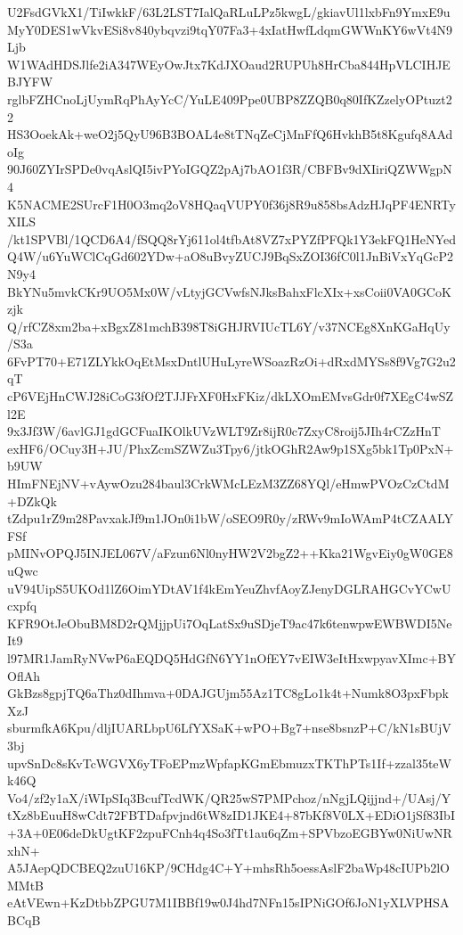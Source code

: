U2FsdGVkX1/TiIwkkF/63L2LST7IalQaRLuLPz5kwgL/gkiavUl1lxbFn9YmxE9u
MyY0DES1wVkvESi8v840ybqvzi9tqY07Fa3+4xIatHwfLdqmGWWnKY6wVt4N9Ljb
W1WAdHDSJlfe2iA347WEyOwJtx7KdJXOaud2RUPUh8HrCba844HpVLCIHJEBJYFW
rglbFZHCnoLjUymRqPhAyYcC/YuLE409Ppe0UBP8ZZQB0q80IfKZzelyOPtuzt22
HS3OoekAk+weO2j5QyU96B3BOAL4e8tTNqZeCjMnFfQ6HvkhB5t8Kgufq8AAdoIg
90J60ZYIrSPDe0vqAslQI5ivPYoIGQZ2pAj7bAO1f3R/CBFBv9dXIiriQZWWgpN4
K5NACME2SUrcF1H0O3mq2oV8HQaqVUPY0f36j8R9u858bsAdzHJqPF4ENRTyXILS
/kt1SPVBl/1QCD6A4/fSQQ8rYj611ol4tfbAt8VZ7xPYZfPFQk1Y3ekFQ1HeNYed
Q4W/u6YuWClCqGd602YDw+aO8uBvyZUCJ9BqSxZOI36fC0l1JnBiVxYqGcP2N9y4
BkYNu5mvkCKr9UO5Mx0W/vLtyjGCVwfsNJksBahxFlcXIx+xsCoii0VA0GCoKzjk
Q/rfCZ8xm2ba+xBgxZ81mchB398T8iGHJRVIUcTL6Y/v37NCEg8XnKGaHqUy/S3a
6FvPT70+E71ZLYkkOqEtMsxDntlUHuLyreWSoazRzOi+dRxdMYSs8f9Vg7G2u2qT
cP6VEjHnCWJ28iCoG3fOf2TJJFrXF0HxFKiz/dkLXOmEMvsGdr0f7XEgC4wSZl2E
9x3Jf3W/6avlGJ1gdGCFuaIKOlkUVzWLT9Zr8ijR0c7ZxyC8roij5JIh4rCZzHnT
exHF6/OCuy3H+JU/PhxZcmSZWZu3Tpy6/jtkOGhR2Aw9p1SXg5bk1Tp0PxN+b9UW
HImFNEjNV+vAywOzu284baul3CrkWMcLEzM3ZZ68YQl/eHmwPVOzCzCtdM+DZkQk
tZdpu1rZ9m28PavxakJf9m1JOn0i1bW/oSEO9R0y/zRWv9mIoWAmP4tCZAALYFSf
pMINvOPQJ5INJEL067V/aFzun6Nl0nyHW2V2bgZ2++Kka21WgvEiy0gW0GE8uQwc
uV94UipS5UKOd1lZ6OimYDtAV1f4kEmYeuZhvfAoyZJenyDGLRAHGCvYCwUcxpfq
KFR9OtJeObuBM8D2rQMjjpUi7OqLatSx9uSDjeT9ac47k6tenwpwEWBWDI5NeIt9
l97MR1JamRyNVwP6aEQDQ5HdGfN6YY1nOfEY7vEIW3eItHxwpyavXImc+BYOflAh
GkBzs8gpjTQ6aThz0dIhmva+0DAJGUjm55Az1TC8gLo1k4t+Numk8O3pxFbpkXzJ
sburmfkA6Kpu/dljIUARLbpU6LfYXSaK+wPO+Bg7+nse8bsnzP+C/kN1sBUjV3bj
upvSnDc8sKvTcWGVX6yTFoEPmzWpfapKGmEbmuzxTKThPTs1If+zzal35teWk46Q
Vo4/zf2y1aX/iWIpSIq3BcufTcdWK/QR25wS7PMPchoz/nNgjLQijjnd+/UAsj/Y
tXz8bEuuH8wCdt72FBTDafpvjnd6tW8zID1JKE4+87bKf8V0LX+EDiO1jSf83IbI
+3A+0E06deDkUgtKF2zpuFCnh4q4So3fTt1au6qZm+SPVbzoEGBYw0NiUwNRxhN+
A5JAepQDCBEQ2zuU16KP/9CHdg4C+Y+mhsRh5oessAslF2baWp48cIUPb2lOMMtB
eAtVEwn+KzDtbbZPGU7M1IBBf19w0J4hd7NFn15sIPNiGOf6JoN1yXLVPHSABCqB
